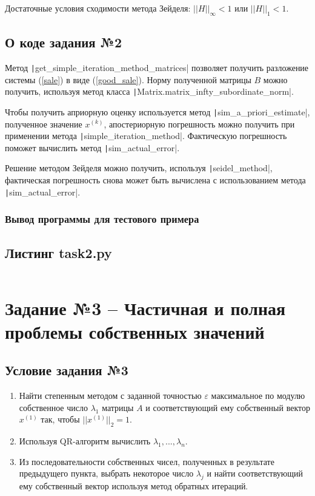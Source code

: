 Достаточные условия сходимости метода Зейделя: $||H||_\infty<1$ или $||H||_1<1$.

\section{О коде задания №2}
Метод \texttt|get_simple_iteration_method_matrices| позволяет получить разложение системы (\ref{sale}) в виде (\ref{good_sale}). Норму полученной матрицы $B$ можно получить, используя метод класса \texttt|Matrix.matrix_infty_subordinate_norm|.

Чтобы получить априорную оценку используется метод \texttt|sim_a_priori_estimate|, полученное значение $x^{(k)}$,  апостериорную погрешность можно получить при применении метода \texttt|simple_iteration_method|. Фактическую погрешность поможет вычислить метод \texttt|sim_actual_error|.

Решение методом Зейделя можно получить, используя \texttt|seidel_method|, фактическая погрешность снова может быть вычислена с использованием метода \texttt|sim_actual_error|.

\subsection{Вывод программы для тестового примера}

\section{Листинг task2.py}
\inputminted{python}{code/task2.py}

\chapter{Задание №3 -- Частичная и полная проблемы собственных значений}
\section{Условие задания №3}
\begin{enumerate}
    \item Найти степенным методом с заданной точностью $\varepsilon$ максимальное по модулю собственное число $\lambda_1$ матрицы $A$ и соответствующий ему собственный вектор $x^{(1)}$ так, чтобы $||x^{(1)}||_2=1$.
    \item Используя QR-алгоритм вычислить $\lambda_1,...,\lambda_n$.
    \item  Из последовательности собственных чисел, полученных в результате предыдущего пункта, выбрать некоторое число $\lambda_j$ и найти соответствующий ему собственный вектор используя метод обратных
итераций.

\end{enumerate}
